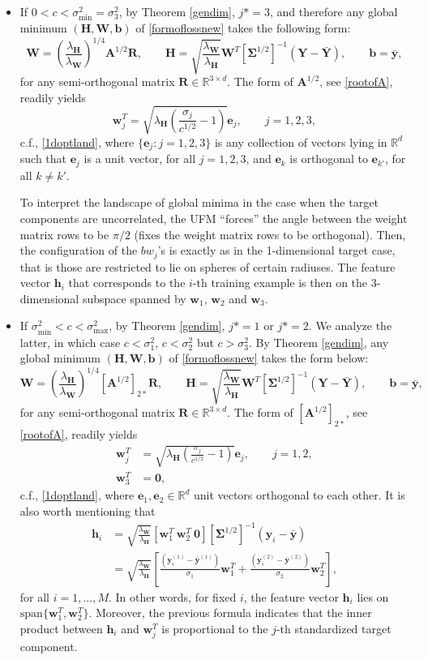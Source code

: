 \documentclass{article}
\theoremstyle{plain}
\theoremstyle{definition}
\theoremstyle{remark}
\newcommand{\bW}{{\mathbf W}}
\newcommand{\bY}{{\mathbf Y}}
\newcommand{\bR}{{\mathbf R}}
\newcommand{\bA}{{\mathbf A}}
\newcommand{\bH}{{\mathbf H}}
\newcommand{\bh}{{\mathbf h}}
\newcommand{\by}{{\mathbf y}}
\newcommand{\byb}{{\bar{\mathbf y}}}
\newcommand{\bYb}{{\bar{\mathbf Y}}}
\newcommand{\bb}{{\mathbf b}}
\newcommand{\be}{{\mathbf e}}
\newcommand{\bw}{{\mathbf w}}
\newcommand{\bSigma}{{\mathbf \Sigma}}
\newcommand{\lH}{\lambda_{\bH}}
\newcommand{\lW}{\lambda_{\bW}}
\begin{document}
\begin{itemize}
    \item If $0<c < \sigma_{\text{min}}^2=\sigma_3^2$, by Theorem \ref{gendim}, $j*=3$, and therefore any global minimum $(\bH, \bW, \bb)$ of \eqref{formoflossnew} takes the following form:
    \[
    \bW = \left(\frac{\lH}{\lW}\right)^{1/4} \bA^{1/2} \bR, \qquad \bH = \sqrt{\frac{\lW}{\lH}}\bW^T [\bSigma^{1/2}]^{-1} (\bY - \bYb), \qquad \bb=\byb,
    \]
    for any semi-orthogonal matrix $\bR\in \mathbb{R}^{3\times d}$. The form of $\bA^{1/2}$, see \eqref{rootofA}, readily yields
    \[
    \bw_j^T=\sqrt{\lH \left(\frac{\sigma_j}{c^{1/2}}-1\right)} \be_j, \qquad j=1,2,3,
     \]
     c.f., \eqref{1doptland}, where $\{\be_j: j=1,2,3\}$ is any collection of vectors lying in $\mathbb{R}^d$ such that $\be_j$ is a unit vector, for all $j=1,2,3$, and $\be_k$ is orthogonal to $\be_{k'}$, for all $k\neq k'$.

     To interpret the landscape of global minima in the case when the target components are uncorrelated, the UFM ``forces'' the angle between the weight matrix rows to be $\pi/2$ (fixes the weight matrix rows to be orthogonal). Then, the configuration of the $bw_j$'s is exactly as in the 1-dimensional target case, that is those are restricted to lie on spheres of certain radiuses. The feature vector $\bh_i$ that corresponds to the $i$-th training example is then on the 3-dimensional subspace spanned by $\bw_1$, $\bw_2$ and $\bw_3$. 
     \item If $\sigma_{\text{min}}^2<c<\sigma_{\text{max}}^2$, by Theorem \ref{gendim}, $j*=1$ or $j*=2$. We analyze the latter, in which case $c<\sigma_1^2$, $c<\sigma_2^2$ but $c>\sigma_3^2$. By Theorem \ref{gendim}, any global minimum $(\bH, \bW, \bb)$ of \eqref{formoflossnew} takes the form below:
     \[
     \bW = \left(\frac{\lH}{\lW}\right)^{1/4} [\bA^{1/2}]_{2*} \bR, \qquad \bH = \sqrt{\frac{\lW}{\lH}}\bW^T [\bSigma^{1/2}]^{-1} (\bY - \bYb), \qquad \bb=\byb, 
     \]
     for any semi-orthogonal matrix $\bR\in \mathbb{R}^{3\times d}$. The form of $[\bA^{1/2}]_{2*}$, see \eqref{rootofA}, readily yields
    \begin{align*}
    \bw_j^T&=\sqrt{\lH \left(\frac{\sigma_j}{c^{1/2}}-1\right)} \be_j, \qquad j=1,2,
    \\
    \bw_3^T&=\mathbf{0},
    \end{align*}
    c.f., \eqref{1doptland}, where $\be_1, \be_2\in \mathbb{R}^d$ unit vectors orthogonal to each other. It is also worth mentioning that 
    \begin{align*}
    \bh_i &=\sqrt{\frac{\lW}{\lH}} \left[\bw_1^T \ \bw_2^T \ \mathbf{0}\right] [\bSigma^{1/2}]^{-1} (\by_i-\byb)
    \\
    &=\sqrt{\frac{\lW}{\lH}} 
    \left[\frac{(\by_i^{(1)}-\byb^{(1)})}{\sigma_1} \bw_1^T+\frac{(\by_i^{(2)}-\byb^{(2)})}{\sigma_2} \bw_2^T\right],
    \end{align*}
    for all $i=1,...,M$. In other words, for fixed $i$, the feature vector $\bh_i$ lies on $\text{span}\{\bw_1^T, \bw_2^T\}$. Moreover, the previous formula indicates that the inner product between $\bh_i$ and $\bw_j^T$ is proportional to the $j$-th standardized target component. 
    

\end{itemize}
\end{document}
